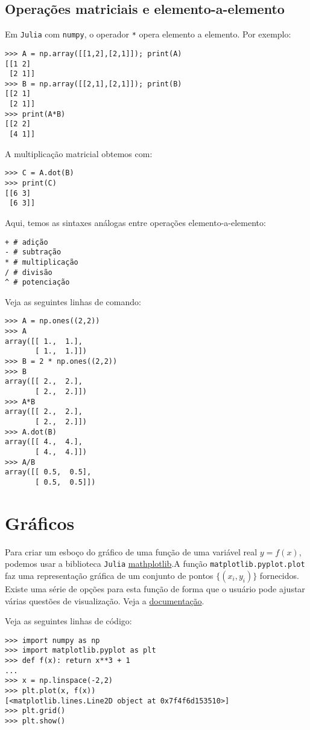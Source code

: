 \subsection{Operações matriciais e elemento-a-elemento}

Em \verb+Julia+ com \verb+numpy+, o operador \verb+*+ opera elemento a elemento. Por exemplo:
\begin{lstlisting}
>>> A = np.array([[1,2],[2,1]]); print(A)
[[1 2]
 [2 1]]
>>> B = np.array([[2,1],[2,1]]); print(B)
[[2 1]
 [2 1]]
>>> print(A*B)
[[2 2]
 [4 1]]
\end{lstlisting}
A multiplicação matricial obtemos com:
\begin{lstlisting}
>>> C = A.dot(B)
>>> print(C)
[[6 3]
 [6 3]]
\end{lstlisting}

Aqui, temos as sintaxes análogas entre operações elemento-a-elemento:
\begin{lstlisting}
+ # adição
- # subtração
* # multiplicação
/ # divisão
^ # potenciação
\end{lstlisting}

\begin{ex}
  Veja as seguintes linhas de comando:
\begin{lstlisting}
>>> A = np.ones((2,2))
>>> A
array([[ 1.,  1.],
       [ 1.,  1.]])
>>> B = 2 * np.ones((2,2))
>>> B
array([[ 2.,  2.],
       [ 2.,  2.]])
>>> A*B
array([[ 2.,  2.],
       [ 2.,  2.]])
>>> A.dot(B)
array([[ 4.,  4.],
       [ 4.,  4.]])
>>> A/B
array([[ 0.5,  0.5],
       [ 0.5,  0.5]])
\end{lstlisting}
\end{ex}














\section{Gráficos}

Para criar um esboço do gráfico de uma função de uma variável real $y = f(x)$, podemos usar a biblioteca \verb+Julia+ \href{https://matplotlib.org/}{mathplotlib}.A função \verb+matplotlib.pyplot.plot+ faz uma representação gráfica de um conjunto de pontos $\{(x_i, y_i)\}$ fornecidos. Existe uma série de opções para esta função de forma que o usuário pode ajustar várias questões de visualização. Veja a \href{https://matplotlib.org/api/pyplot_api.html?highlight=pyplot.plot#matplotlib.pyplot.plot}{documentação}.

\begin{ex}
  Veja as seguintes linhas de código:
\begin{lstlisting}
>>> import numpy as np
>>> import matplotlib.pyplot as plt
>>> def f(x): return x**3 + 1
...
>>> x = np.linspace(-2,2)
>>> plt.plot(x, f(x))
[<matplotlib.lines.Line2D object at 0x7f4f6d153510>]
>>> plt.grid()
>>> plt.show()
\end{lstlisting}
\end{ex}
